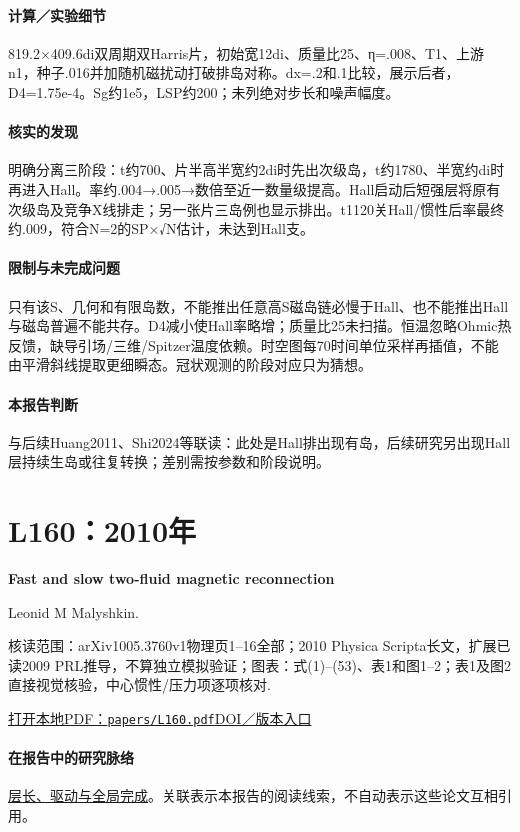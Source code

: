 \documentclass[UTF8,a4paper,11pt,openany,fontset=fandol]{ctexbook}
\begin{document}
\paragraph{计算／实验细节}819.2×409.6di双周期双Harris片，初始宽12di、质量比25、η=.008、T1、上游n1，种子.016并加随机磁扰动打破排岛对称。dx=.2和.1比较，展示后者，D4=1.75e-4。Sg约1e5，LSP约200；未列绝对步长和噪声幅度。

\paragraph{核实的发现}明确分离三阶段：t约700、片半高半宽约2di时先出次级岛，t约1780、半宽约di时再进入Hall。率约.004→.005→数倍至近一数量级提高。Hall启动后短强层将原有次级岛及竞争X线排走；另一张片三岛例也显示排出。t1120关Hall/惯性后率最终约.009，符合N=2的SP×√N估计，未达到Hall支。

\paragraph{限制与未完成问题}只有该S、几何和有限岛数，不能推出任意高S磁岛链必慢于Hall、也不能推出Hall与磁岛普遍不能共存。D4减小使Hall率略增；质量比25未扫描。恒温忽略Ohmic热反馈，缺导引场/三维/Spitzer温度依赖。时空图每70时间单位采样再插值，不能由平滑斜线提取更细瞬态。冠状观测的阶段对应只为猜想。

\paragraph{本报告判断}与后续Huang2011、Shi2024等联读：此处是Hall排出现有岛，后续研究另出现Hall层持续生岛或往复转换；差别需按参数和阶段说明。

\section{L160：2010年}\label{paper:L160}

\textbf{Fast and slow two-fluid magnetic reconnection}\citep{L160}\

Leonid M Malyshkin.

\textsf{核读范围：}arXiv1005.3760v1物理页1–16全部；2010 Physica Scripta长文，扩展已读2009 PRL推导，不算独立模拟验证；\textsf{图表：}式(1)–(53)、表1和图1–2；表1及图2直接视觉核验，中心惯性/压力项逐项核对.

\href{run:../papers/L160.pdf}{打开本地PDF：\texttt{papers/L160.pdf}}\quad\href{https://doi.org/10.1088/0031-8949/2010/t142/014033}{DOI／版本入口}

\paragraph{在报告中的研究脉络}\hyperref[story:global]{层长、驱动与全局完成}。关联表示本报告的阅读线索，不自动表示这些论文互相引用。
\end{document}
